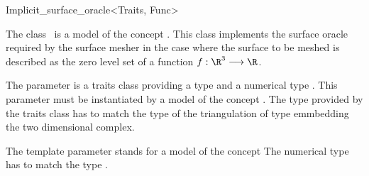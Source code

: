 

\begin{ccRefClass}{Implicit_surface_oracle<Traits, Func>}  %


\ccDefinition
  
The class \ccRefName\  is a model of the concept
. 
This class implements the surface oracle
required by the surface mesher 
in the case
where the surface to be meshed is described as the zero level
set  of a function $f : \R^3 \longrightarrow \R$.

The parameter  is a traits class providing 
a type  and a numerical type .
This parameter  must be instantiated by 
a model of the concept .
The  type provided by the traits class  
has to match  the  type of the
triangulation of  type  emmbedding
the two dimensional complex.

The template parameter   stands for a model
of the concept 
The numerical type  has to match
the type .



\ccIsModel










\end{ccRefClass}
